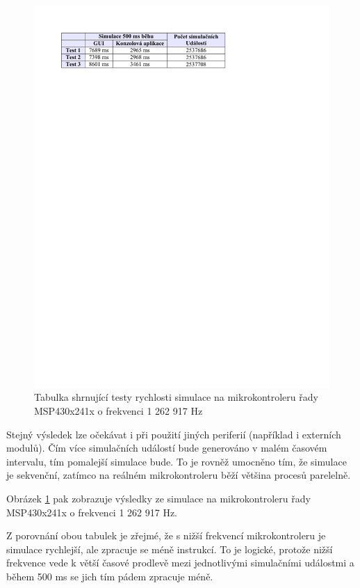 \begin{figure}[ht]
\centering
\includegraphics[trim=0cm 23.5cm 2cm 2cm]{fig/tabulka2}
\caption{Tabulka shrnující testy rychlosti simulace na mikrokontroleru řady MSP430x241x o frekvenci 1 262 917 Hz}
\label{fig:tabulka2}
\end{figure}

Stejný výsledek lze očekávat i při použití jiných periferií (například i externích modulů). Čím více simulačních událostí bude generováno v malém časovém intervalu, tím pomalejší simulace bude. To je rovněž umocněno tím, že simulace je sekvenční, zatímco na reálném mikrokontroleru běží většina procesů parelelně.

Obrázek \ref{fig:tabulka2} pak zobrazuje výsledky ze simulace na mikrokontroleru řady MSP430x241x o frekvenci 1 262 917 Hz.

Z porovnání obou tabulek je zřejmé, že s nižší frekvencí mikrokontroleru je simulace rychlejší, ale zpracuje se méně instrukcí. To je logické, protože nižší frekvence vede k větší časové prodlevě mezi jednotlivými simulačními událostmi a během 500 ms se jich tím pádem zpracuje méně.

